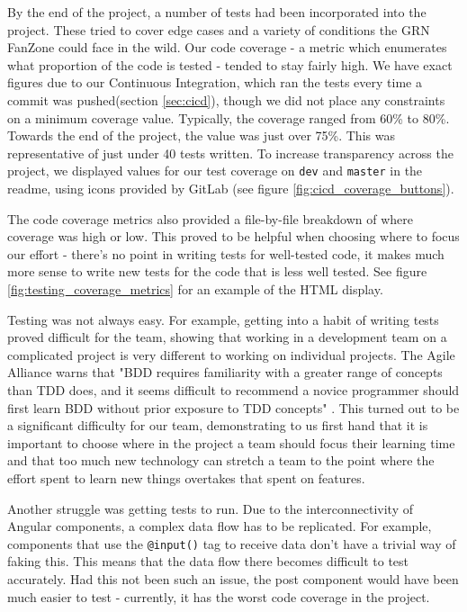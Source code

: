 \documentclass{l3proj}
\begin{document}
By the end of the project, a number of tests had been incorporated into the
 project. These tried to cover edge cases and a variety of conditions the GRN FanZone
 could face in the wild. Our code coverage - a metric which enumerates what
 proportion of the code is tested - tended to stay fairly high. We have exact
 figures due to our Continuous Integration, which ran the tests every time a
 commit was pushed(section \ref{sec:cicd}), though we did not place any constraints
 on a minimum coverage value. Typically, the coverage ranged from 60\% to 80\%.
 Towards the end of the project, the value was just over 75\%. This was
 representative of just under 40 tests written. To increase transparency
 across the project, we displayed values for our test coverage on \texttt{dev} and
 \texttt{master} in the readme, using icons provided by GitLab (see figure
 \ref{fig:cicd_coverage_buttons}).

 The code coverage metrics also provided a file-by-file breakdown of where
 coverage was high or low. This proved to be helpful when choosing
 where to focus our effort - there's no point in writing tests for
 well-tested code, it makes much more sense to write new tests for the
 code that is less well tested. See figure \ref{fig:testing_coverage_metrics}
 for an example of the HTML display.
 
Testing was not always easy. For example, getting into a habit of writing tests
 proved difficult for the team, showing that working in a development team on a
 complicated project is very different to working on individual projects. The
 Agile Alliance warns that "BDD requires familiarity with a greater range of
 concepts than TDD does, and it seems difficult to recommend a novice programmer
 should first learn BDD without prior exposure to TDD concepts"
 \cite{agilealliance_bdd}. This turned out to be a significant difficulty for
 our team, demonstrating to us first hand that it is important to choose where
 in the project a team should focus their learning time and that too much new technology
 can stretch a team to the point where the effort spent to learn new things
 overtakes that spent on features.



Another struggle was getting tests to run. Due to the interconnectivity of
 Angular components, a complex data flow has to be replicated. For example,
 components that use the \texttt{@input()} tag to receive data don't have a
 trivial way of faking this. This means that the data flow there becomes
 difficult to test accurately. Had this not been such an issue, the post
 component would have been much easier to test - currently, it has the worst
 code coverage in the project.
\end{document}

